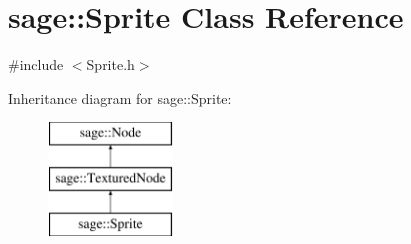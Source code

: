 \hypertarget{classsage_1_1Sprite}{}\section{sage\+::Sprite Class Reference}
\label{classsage_1_1Sprite}


{\ttfamily \#include $<$Sprite.\+h$>$}

Inheritance diagram for sage\+::Sprite\+:\begin{figure}[H]
\begin{center}
\leavevmode
\includegraphics[height=3.000000cm]{classsage_1_1Sprite}
\end{center}
\end{figure}
